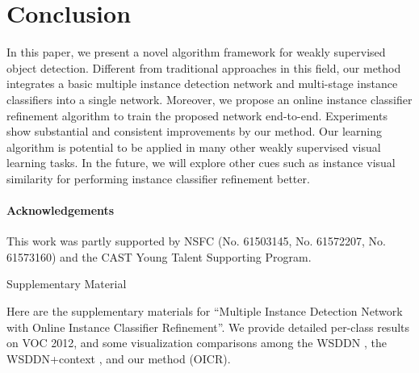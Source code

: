 \documentclass[10pt,twocolumn,letterpaper]{article}
\begin{document}
\section{Conclusion}
\label{sec:con}

In this paper, we present a novel algorithm framework for weakly supervised object detection.
Different from traditional approaches in this field, our method integrates a basic multiple instance detection network and multi-stage instance classifiers into a single network.
Moreover, we propose an online instance classifier refinement algorithm to train the proposed network end-to-end.
Experiments show substantial and consistent improvements by our method.
Our learning algorithm is potential to be applied in many other weakly supervised visual learning tasks.
In the future, we will explore other cues such as instance visual similarity for performing instance classifier refinement better.


\paragraph{Acknowledgements}
This work was partly supported by NSFC (No. 61503145, No. 61572207, No. 61573160) and the CAST Young Talent Supporting Program.


{\small


}



\clearpage
\renewcommand{\figurename}{Supplementary Figure}
\renewcommand{\tablename}{Supplementary Table}
\setcounter{section}{0}
\setcounter{figure}{0}
\setcounter{table}{0}

{\LARGE Supplementary Material}
\maketitle



Here are the supplementary materials for ``Multiple Instance Detection Network with Online Instance Classifier Refinement''.
We provide detailed per-class results on VOC 2012, and some visualization comparisons among the WSDDN \cite{Ref:Bilen2016}, the WSDDN+context \cite{Ref:Kantorov2016}, and our method (OICR).
\end{document}

